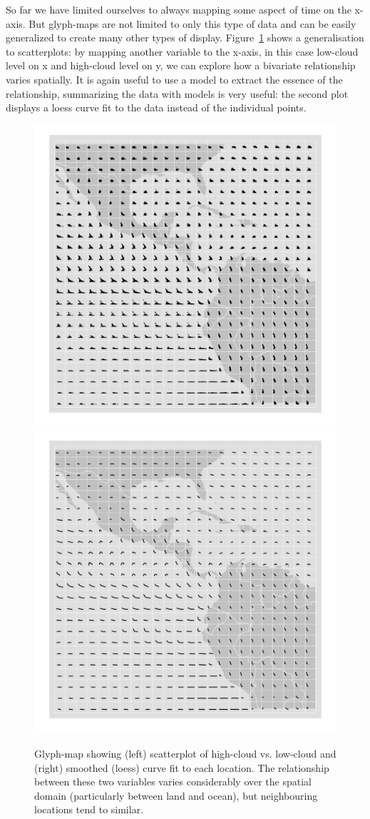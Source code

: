 \documentclass[oneside]{article}
\begin{document}
So far we have limited ourselves to always mapping some aspect of time on the x-axis. But glyph-maps are not limited to only this type of data and can  be easily generalized to create many other types of display. Figure~\ref{fig:cloud} shows a generalisation to scatterplots: by mapping another variable to the x-axis, in this case low-cloud level on x and high-cloud level on y, we can explore how a bivariate relationship varies spatially. It is again useful to use a model to extract the essence of the relationship, summarizing the data with models is very useful: the second plot displays a loess curve fit to the data instead of the individual points.  

\begin{figure}[htbp]
  \centering
  \includegraphics[width=0.5\linewidth]{clouds}%
  \includegraphics[width=0.5\linewidth]{clouds-smooth}

  \caption{Glyph-map showing (left) scatterplot of high-cloud vs. low-cloud and (right) smoothed (loess) curve fit to each location. The relationship between these two variables varies considerably over the spatial domain (particularly between land and ocean), but neighbouring locations tend to similar. }
  \label{fig:cloud}
\end{figure}
\end{document}

